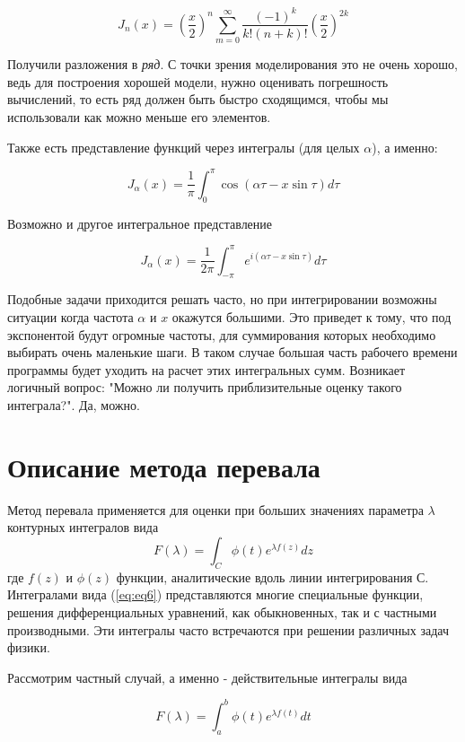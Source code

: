 \documentclass[14pt]{extarticle}
\begin{document}
$$
J_n(x)=\left(\frac{x}{2}\right)^n\sum_{m=0}^{\infty}\frac{(-1)^k}{k! (n+k)!}{\left(\frac{x}{2}\right)}^{2k}
$$

Получили разложения в \textit{ряд}. С точки зрения моделирования это не очень хорошо, ведь для построения хорошей модели, нужно оценивать погрешность вычислений, то есть ряд должен быть быстро сходящимся, чтобы мы использовали как можно меньше его элементов. 

Также есть представление функций через интегралы (для целых $\alpha$), а именно:

$$
J_\alpha(x)=\frac{1}{\pi}\int_{0}^{\pi}\cos(\alpha\tau-x\sin\tau)d\tau
$$

Возможно и другое интегральное представление\cite{Fedoryuk}

\begin{equation}\label{eq:eq5}
J_\alpha(x)=\frac{1}{2\pi}\int_{-\pi}^{\pi}e^{i(\alpha\tau-x\sin\tau)}d\tau
\end{equation} 
  
Подобные задачи приходится решать часто, но при интегрировании возможны ситуации когда частота $\alpha$ и $x$ окажутся большими. Это приведет к тому, что под экспонентой будут огромные частоты, для суммирования которых необходимо выбирать очень маленькие шаги. В таком случае большая часть рабочего времени программы будет уходить на расчет этих интегральных сумм. Возникает логичный вопрос: "Можно ли получить приблизительные оценку такого интеграла?". Да, можно.

\section{Описание метода перевала} 

Метод перевала применяется для оценки при больших значениях параметра $\lambda$ контурных интегралов вида
\begin{equation}\label{eq:eq6}
F(\lambda) = \int_{C}^{}\phi(t)e^{\lambda f(z)}dz
\end{equation} 
где $f(z)$ и $\phi(z)$ функции, аналитические вдоль линии интегрирования С. Интегралами вида (\ref{eq:eq6}) представляются многие специальные функции, решения дифференциальных уравнений, как обыкновенных, так и с частными производными. Эти интегралы часто встречаются при решении различных задач физики.

Рассмотрим частный случай, а именно - действительные интегралы вида

\begin{equation}\label{eq:eq7}
F(\lambda) = \int_{a}^{b}\phi(t)e^{\lambda f(t)}dt
\end{equation} 
\end{document}
